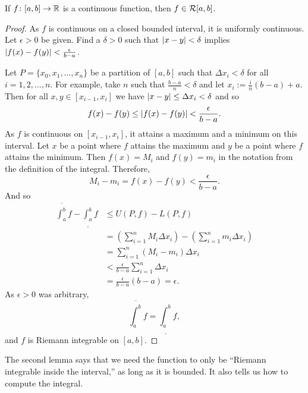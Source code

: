 \begin{lemma} \label{lemma:contint}
If $f \colon [a,b] \to {\mathbb{R}}$ is a continuous function,
then $f \in {\mathcal{R}}[a,b]$.
\end{lemma}

\begin{proof}
As $f$ is continuous on a closed bounded interval, it is
uniformly continuous.
Let $\epsilon > 0$ be given.  Find a $\delta > 0$ such that
$\left\lvert {x-y} \right\rvert < \delta$ implies $\left\lvert {f(x)-f(y)} \right\rvert < \frac{\epsilon}{b-a}$.

Let $P = \{ x_0, x_1, \ldots, x_n \}$
be a partition of $[a,b]$ such that $\Delta x_i < \delta$ for all $i = 1,2,
\ldots, n$.  For example,
take $n$ such that $\frac{b-a}{n} < \delta$ and
let $x_i := \frac{i}{n}(b-a) + a$.
Then for all $x, y \in [x_{i-1},x_i]$ we have 
$\left\lvert {x-y} \right\rvert \leq \Delta x_i < \delta$ and so
\begin{equation*}
f(x)-f(y) \leq \left\lvert {f(x)-f(y)} \right\rvert < \frac{\epsilon}{b-a} .
\end{equation*}
As $f$ is continuous on $[x_{i-1},x_i]$, it attains a maximum and a minimum
on this interval.
Let $x$ be a point where $f$ attains the maximum and $y$ be a point
where $f$ attains the minimum.  Then $f(x) = M_i$
and $f(y) = m_i$ in the notation from the definition of the integral.
Therefore,
\begin{equation*}
M_i-m_i = f(x)-f(y) < 
\frac{\epsilon}{b-a} .
\end{equation*}
And so
\begin{equation*}
\begin{split}
\overline{\int_a^b} f - 
\underline{\int_a^b} f 
& \leq
U(P,f) - L(P,f)
\\
& =
\left(
\sum_{i=1}^n
M_i \Delta x_i
\right)
-
\left(
\sum_{i=1}^n
m_i \Delta x_i
\right)
\\
& =
\sum_{i=1}^n
(M_i-m_i) \Delta x_i
\\
& <
\frac{\epsilon}{b-a}
\sum_{i=1}^n
\Delta x_i
\\
& =
\frac{\epsilon}{b-a} (b-a)
= \epsilon .
\end{split}
\end{equation*}
As $\epsilon > 0$ was arbitrary,
\begin{equation*}
\overline{\int_a^b} f = \underline{\int_a^b} f ,
\end{equation*}
and $f$ is Riemann integrable on $[a,b]$.
\end{proof}

The second lemma says that we need the function to only be ``Riemann integrable
inside the interval,'' as long as it is bounded.  It also tells us how to
compute the integral.

